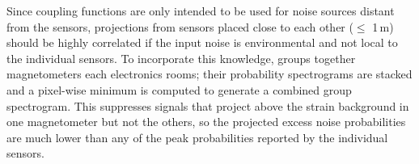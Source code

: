 Since coupling functions are only intended to be used for noise sources distant from the sensors, projections from sensors placed close to each other ($\leqslant$ 1\,m) should be highly correlated if the input noise is environmental and not local to the individual sensors.
To incorporate this knowledge,  groups together magnetometers each electronics rooms; their probability spectrograms are stacked and a pixel-wise minimum is computed to generate a combined group spectrogram.
This suppresses signals that project above the strain background in one magnetometer but not the others, so the projected excess noise probabilities are much lower than any of the peak probabilities reported by the individual sensors.
